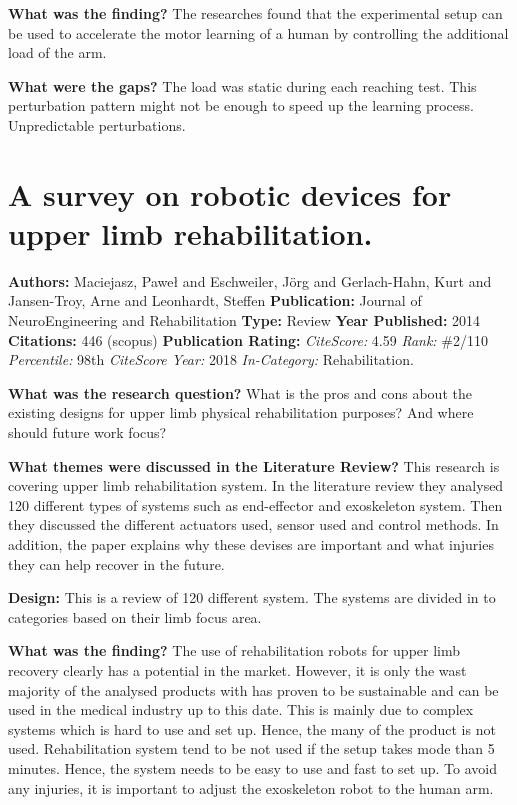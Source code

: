 \textbf{What was the finding?} 
The researches found that the experimental setup can be used to accelerate the motor learning of a human by controlling the additional load of the arm. 

\textbf{What were the gaps?}   
 The load was static during each reaching test. This perturbation pattern might not be enough to speed up the learning process. 
 Unpredictable perturbations. 


\section{A survey on robotic devices for upper limb rehabilitation.} 
\textbf{Authors:} Maciejasz, Pawe{\l} and Eschweiler, J{\"o}rg and Gerlach-Hahn, Kurt and Jansen-Troy, Arne and Leonhardt, Steffen \newline
\textbf{Publication:} Journal of NeuroEngineering and Rehabilitation
\textbf{Type:} Review \newline
\textbf{Year Published:} 2014
\textbf{Citations:} 446 (scopus) \newline 
\textbf{Publication Rating:}    
\textit{CiteScore:} 4.59 \textit{Rank:} \#2/110  \textit{Percentile:} 98th  \newline
\textit{CiteScore Year:} 2018
\textit{In-Category:} Rehabilitation.

\textbf{What was the research question?} 
What is the pros and cons about the existing designs for upper limb physical rehabilitation purposes? And where should future work focus? 

\textbf{What themes were discussed in the Literature Review?}   
This research is covering upper limb rehabilitation system. In the literature review they analysed 120 different types of systems such as end-effector and exoskeleton system. Then they discussed the different actuators used, sensor used and control methods. In addition, the paper explains why these devises are important and what injuries they can help recover in the future. 

\textbf{Design:}  
This is a review of 120 different system. The systems are divided in to categories based on their limb focus area. 

\textbf{What was the finding?} 
The use of rehabilitation robots for upper limb recovery clearly has a potential in the market. However, it is only the wast majority of the analysed products with has proven to be sustainable and can be used in the medical industry up to this date. This is mainly due to complex systems which is hard to use and set up. Hence, the many of the product is not used. Rehabilitation system tend to be not used if the setup takes mode than 5 minutes. Hence, the system needs to be easy to use and fast to set up. To avoid any injuries, it is important to adjust the exoskeleton robot to the human arm.  

